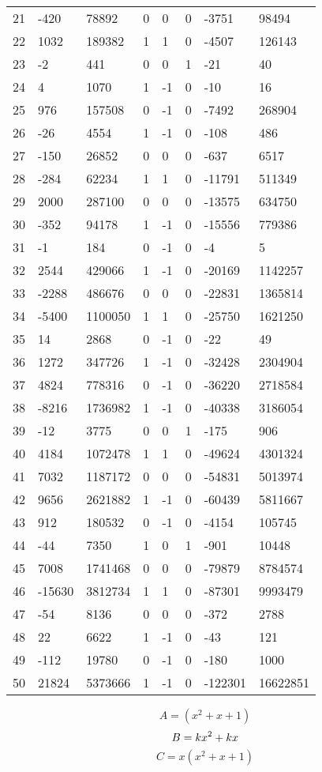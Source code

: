 \documentclass{amsart}
\begin{document}
\begin{longtable}{|l|l|l|lllll|}
21&-420&78892&0&0&0&-3751&98494\\
22&1032&189382&1&1&0&-4507&126143\\
23&-2&441&0&0&1&-21&40\\
24&4&1070&1&-1&0&-10&16\\
25&976&157508&0&-1&0&-7492&268904\\
26&-26&4554&1&-1&0&-108&486\\
27&-150&26852&0&0&0&-637&6517\\
28&-284&62234&1&1&0&-11791&511349\\
29&2000&287100&0&0&0&-13575&634750\\
30&-352&94178&1&-1&0&-15556&779386\\
31&-1&184&0&-1&0&-4&5\\
32&2544&429066&1&-1&0&-20169&1142257\\
33&-2288&486676&0&0&0&-22831&1365814\\
34&-5400&1100050&1&1&0&-25750&1621250\\
35&14&2868&0&-1&0&-22&49\\
36&1272&347726&1&-1&0&-32428&2304904\\
37&4824&778316&0&-1&0&-36220&2718584\\
38&-8216&1736982&1&-1&0&-40338&3186054\\
39&-12&3775&0&0&1&-175&906\\
40&4184&1072478&1&1&0&-49624&4301324\\
41&7032&1187172&0&0&0&-54831&5013974\\
42&9656&2621882&1&-1&0&-60439&5811667\\
43&912&180532&0&-1&0&-4154&105745\\
44&-44&7350&1&0&1&-901&10448\\
45&7008&1741468&0&0&0&-79879&8784574\\
46&-15630&3812734&1&1&0&-87301&9993479\\
47&-54&8136&0&0&0&-372&2788\\
48&22&6622&1&-1&0&-43&121\\
49&-112&19780&0&-1&0&-180&1000\\
50&21824&5373666&1&-1&0&-122301&16622851\\
\hline
\end{longtable}
$$A=(x^2
 + x
 + 1)$$
$$B=k\*x^2
 + k\*x$$
$$C=x(x^2
 + x
 + 1)$$
\end{document}
